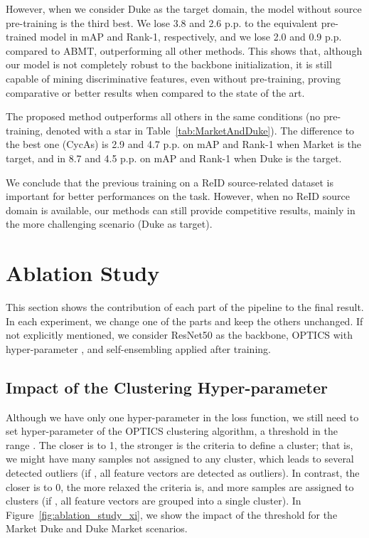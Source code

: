 \documentclass[journal]{IEEEtran}
\begin{document}
However, when we consider Duke as the target domain, the model without source pre-training is the third best. We lose 3.8 and 2.6 p.p. to the equivalent pre-trained model in mAP and Rank-1, respectively, and we lose 2.0 and 0.9 p.p. compared to ABMT, outperforming all other methods. This shows that, although our model is not completely robust to the backbone initialization, it is still capable of mining discriminative features, even without pre-training, proving comparative or better results when compared to the state of the art.

The proposed method outperforms all others in the same conditions (no pre-training, denoted with a star in Table~\ref{tab:MarketAndDuke}). The difference to the best one (CycAs) is 2.9 and 4.7 p.p. on mAP and Rank-1 when Market is the target, and in 8.7 and 4.5 p.p. on mAP and Rank-1 when Duke is the target. 

We conclude that the previous training on a ReID source-related dataset is important for better performances on the task. However, when no ReID source domain is available, our methods can still provide competitive results, mainly in the more challenging scenario (Duke as target). 





\section{Ablation Study}
\label{sec:ablation_study}
This section shows the contribution of each part of the pipeline to the final result. In each experiment, we change one of the parts and keep the others unchanged. If not explicitly mentioned, we consider ResNet50 as the backbone, OPTICS with hyper-parameter , and self-ensembling applied after training.  

\subsection{Impact of the Clustering Hyper-parameter}
\label{subsec:impact_of_xi}

Although we have only one hyper-parameter in the loss function, we still need to set hyper-parameter   of the OPTICS clustering algorithm, a threshold in the range . The closer  is to 1, the stronger is the criteria to define a cluster; that is, we might have many samples not assigned to any cluster, which leads to several detected outliers (if , all feature vectors are detected as outliers). In contrast, the closer  is to 0, the more relaxed the criteria is, and more samples are assigned to clusters (if , all feature vectors are grouped into a single cluster). In Figure~\ref{fig:ablation_study_xi}, we show the impact of the threshold  for the Market  Duke and Duke  Market scenarios.
\end{document}
